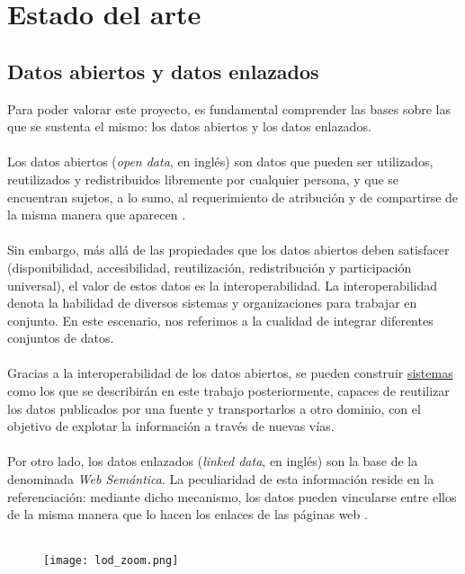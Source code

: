 \section{Estado del arte}

    \subsection{Datos abiertos y datos enlazados}
        Para poder valorar este proyecto, es fundamental comprender las bases sobre las que se sustenta el mismo: los datos abiertos y los datos enlazados.
        \\  \\
        Los datos abiertos (\textit{open data}, en inglés) son datos que pueden ser utilizados, reutilizados y redistribuidos libremente por cualquier persona, y que se encuentran sujetos, a lo sumo, al requerimiento de atribución y de compartirse de la misma manera que aparecen \cite{OPENDATA}.
        \\ \\
        Sin embargo, más allá de las propiedades que los datos abiertos deben satisfacer (disponibilidad, accesibilidad, reutilización, redistribución y participación universal), el valor de estos datos es la interoperabilidad. La interoperabilidad denota la habilidad de diversos sistemas y organizaciones para trabajar en conjunto. En este escenario, nos referimos a la cualidad de integrar diferentes conjuntos de datos.
        \\ \\
        Gracias a la interoperabilidad de los datos abiertos, se pueden construir \hyperref[sec:software]{sistemas} como los que se describirán en este trabajo posteriormente, capaces de reutilizar los datos publicados por una fuente y transportarlos a otro dominio, con el objetivo de explotar la información a través de nuevas vías.
        \\ \\
        Por otro lado, los datos enlazados (\textit{linked data}, en inglés) son la base de la denominada \textit{Web Semántica}. La peculiaridad de esta información reside en la referenciación: mediante dicho mecanismo, los datos pueden vincularse entre ellos de la misma manera que lo hacen los enlaces de las páginas web \cite{LINKEDDATA}.
        \\ \\
        
        \begin{figure}[h]
            \centering
            \texttt{[image: lod\_zoom.png]}
            \label{fig:lod}
        \end{figure}
        
